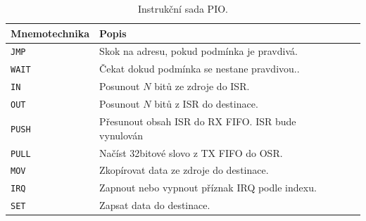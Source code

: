 \documentclass[11pt, a4paper, plain]{article}
\begin{document}
\begin{table}
    \centering
    \begin{tabular}{llp{5cm}l}
        \toprule
        \textbf{Mnemotechnika} & \textbf{Popis} \\
        \midrule
        \texttt{JMP} & Skok na adresu, pokud podmínka je pravdivá. \\
        \texttt{WAIT} & Čekat dokud podmínka se nestane pravdivou.. \\
        \texttt{IN} & Posunout $N$ bitů ze zdroje do ISR. \\
        \texttt{OUT} & Posunout $N$ bitů z ISR do destinace. \\
        \texttt{PUSH} & Přesunout obsah ISR do RX FIFO. ISR bude vynulován \\
        \texttt{PULL} & Načíst 32bitové slovo z TX FIFO do OSR. \\
        \texttt{MOV} & Zkopírovat data ze zdroje do destinace. \\
        \texttt{IRQ} & Zapnout nebo vypnout příznak IRQ podle indexu. \\
        \texttt{SET} & Zapsat data do destinace. \\
        \bottomrule
    \end{tabular}
    \caption{Instrukční sada PIO.}
    \label{tab:pio_isa}
\end{table}
\end{document}
